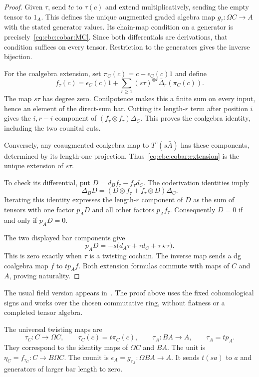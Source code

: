 \begin{proof}
Given $\tau$, send $tc$ to $\tau(c)$ and extend multiplicatively, sending the empty tensor to $1_A$.
This defines the unique augmented graded algebra map $g_\tau:\Omega C\to A$ with the stated generator values.
Its chain-map condition on a generator is precisely~\eqref{eq:cbc:cobar:MC}.
Since both differentials are derivations, that condition suffices on every tensor.
Restriction to the generators gives the inverse bijection.

For the coalgebra extension, set $\pi_C(c)=c-\epsilon_C(c)1$ and define
\begin{equation}\label{eq:cbc:cobar:extension}
 f_\tau(c)=\epsilon_C(c)1+
       \sum_{r\geq1}(s\tau)^{\otimes r}\bar\Delta_r(\pi_C(c)).
\end{equation}
The map $s\tau$ has degree zero.
Conilpotence makes this a finite sum on every input, hence an element of the direct-sum bar.
Cutting its length-$r$ term after position $i$ gives the $i,r-i$ component of $(f_\tau\otimes f_\tau)\Delta_C$.
This proves the coalgebra identity, including the two counital cuts.

Conversely, any coaugmented coalgebra map to $T^c(s\bar A)$ has these components, determined by its length-one projection.
Thus~\eqref{eq:cbc:cobar:extension} is the unique extension of $s\tau$.

To check its differential, put $D=d_Bf_\tau-f_\tau d_C$.
The coderivation identities imply
\[
 \Delta_BD=(D\otimes f_\tau+f_\tau\otimes D)\Delta_C.
\]
Iterating this identity expresses the length-$r$ component of $D$ as the sum of tensors with one factor $p_AD$ and all other factors $p_Af_\tau$.
Consequently $D=0$ if and only if $p_AD=0$.

The two displayed bar components give
\[
 p_AD=-s\bigl(d_A\tau+\tau d_C+\tau\star\tau\bigr).
\]
This is zero exactly when $\tau$ is a twisting cochain.
The inverse map sends a dg coalgebra map $f$ to $t p_Af$.
Both extension formulas commute with maps of $C$ and $A$, proving naturality.
\end{proof}

The usual field version appears in~\cite[Theorem~2.2.9]{LV}.
The proof above uses the fixed cohomological signs and works over the chosen commutative ring, without flatness or a completed tensor algebra.

The universal twisting maps are
\[
 \tau_C:C\longrightarrow\Omega C,\qquad \tau_C(c)=t\pi_C(c),
 \qquad
 \tau_A:BA\longrightarrow A,\qquad \tau_A=t p_A.
\]
They correspond to the identity maps of $\Omega C$ and $BA$.
The unit is $\eta_C=f_{\tau_C}:C\to B\Omega C$.
The counit is $\epsilon_A=g_{\tau_A}:\Omega BA\to A$.
It sends $t(sa)$ to $a$ and generators of larger bar length to zero.

